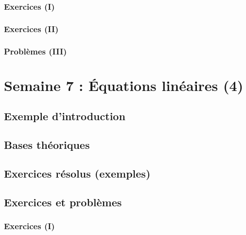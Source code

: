 \documentclass[
  12pt,
]{book}
\begin{document}
\hypertarget{exercices-i-5}{%
\subsection{Exercices (I)}\label{exercices-i-5}}

\hypertarget{exercices-ii-5}{%
\subsection{Exercices (II)}\label{exercices-ii-5}}

\hypertarget{probluxe8mes-iii-5}{%
\subsection{Problèmes (III)}\label{probluxe8mes-iii-5}}

\hypertarget{semaine-7-uxe9quations-linuxe9aires-4}{%
\chapter{Semaine 7 : Équations linéaires (4)}\label{semaine-7-uxe9quations-linuxe9aires-4}}

\hypertarget{exemple-dintroduction-6}{%
\section{Exemple d'introduction}\label{exemple-dintroduction-6}}

\hypertarget{bases-thuxe9oriques-6}{%
\section{Bases théoriques}\label{bases-thuxe9oriques-6}}

\hypertarget{exercices-ruxe9solus-exemples-6}{%
\section{Exercices résolus (exemples)}\label{exercices-ruxe9solus-exemples-6}}

\hypertarget{exercices-et-probluxe8mes-6}{%
\section{Exercices et problèmes}\label{exercices-et-probluxe8mes-6}}

\hypertarget{exercices-i-6}{%
\subsection{Exercices (I)}\label{exercices-i-6}}
\end{document}
